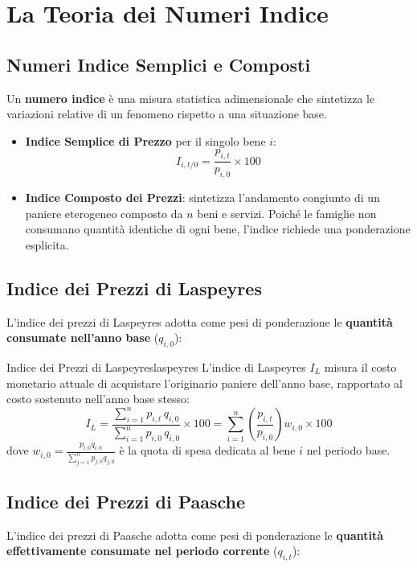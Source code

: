 \section{La Teoria dei Numeri Indice}

\subsection{Numeri Indice Semplici e Composti}
Un \textbf{numero indice} è una misura statistica adimensionale che sintetizza le variazioni relative di un fenomeno rispetto a una situazione base.
\begin{itemize}
    \item \textbf{Indice Semplice di Prezzo} per il singolo bene $i$:
    \begin{equation}
        I_{i, t/0} = \frac{p_{i, t}}{p_{i, 0}} \times 100
    \end{equation}
    \item \textbf{Indice Composto dei Prezzi}: sintetizza l'andamento congiunto di un paniere eterogeneo composto da $n$ beni e servizi. Poiché le famiglie non consumano quantità identiche di ogni bene, l'indice richiede una ponderazione esplicita.
\end{itemize}

\subsection{Indice dei Prezzi di Laspeyres}
L'indice dei prezzi di Laspeyres adotta come pesi di ponderazione le \textbf{quantità consumate nell'anno base} ($q_{i,0}$):

\begin{definizione}{Indice dei Prezzi di Laspeyres}{laspeyres}
L'indice di Laspeyres $I_L$ misura il costo monetario attuale di acquistare l'originario paniere dell'anno base, rapportato al costo sostenuto nell'anno base stesso:
\begin{equation}
    I_L = \frac{\sum_{i=1}^n p_{i,t} \, q_{i,0}}{\sum_{i=1}^n p_{i,0} \, q_{i,0}} \times 100 = \sum_{i=1}^n \left( \frac{p_{i,t}}{p_{i,0}} \right) w_{i,0} \times 100
    \label{eq:laspeyres}
\end{equation}
dove $w_{i,0} = \frac{p_{i,0} q_{i,0}}{\sum_{j=1}^n p_{j,0} q_{j,0}}$ è la quota di spesa dedicata al bene $i$ nel periodo base.
\end{definizione}

\subsection{Indice dei Prezzi di Paasche}
L'indice dei prezzi di Paasche adotta come pesi di ponderazione le \textbf{quantità effettivamente consumate nel periodo corrente} ($q_{i,t}$):

